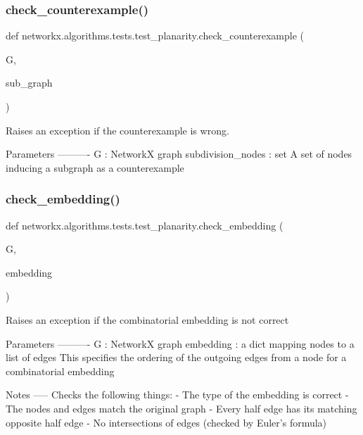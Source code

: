 \subsubsection{\texorpdfstring{check\+\_\+counterexample()}{check\_counterexample()}}
{\footnotesize\ttfamily def networkx.\+algorithms.\+tests.\+test\+\_\+planarity.\+check\+\_\+counterexample (\begin{DoxyParamCaption}\item[{}]{G,  }\item[{}]{sub\+\_\+graph }\end{DoxyParamCaption})}

\begin{DoxyVerb}Raises an exception if the counterexample is wrong.

Parameters
----------
G : NetworkX graph
subdivision_nodes : set
    A set of nodes inducing a subgraph as a counterexample
\end{DoxyVerb}
 \mbox{\label{namespacenetworkx_1_1algorithms_1_1tests_1_1test__planarity_a0ac528d113c1bab2f8f92697052d2531}} 
\subsubsection{\texorpdfstring{check\+\_\+embedding()}{check\_embedding()}}
{\footnotesize\ttfamily def networkx.\+algorithms.\+tests.\+test\+\_\+planarity.\+check\+\_\+embedding (\begin{DoxyParamCaption}\item[{}]{G,  }\item[{}]{embedding }\end{DoxyParamCaption})}

\begin{DoxyVerb}Raises an exception if the combinatorial embedding is not correct

Parameters
----------
G : NetworkX graph
embedding : a dict mapping nodes to a list of edges
    This specifies the ordering of the outgoing edges from a node for
    a combinatorial embedding

Notes
-----
Checks the following things:
    - The type of the embedding is correct
    - The nodes and edges match the original graph
    - Every half edge has its matching opposite half edge
    - No intersections of edges (checked by Euler's formula)
\end{DoxyVerb}
 